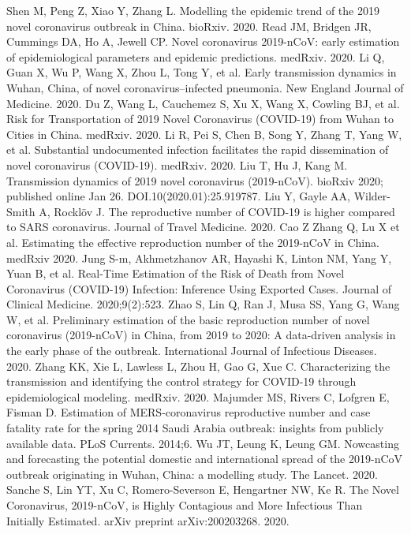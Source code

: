 \documentclass{article}
\begin{document}
\begin{thebibliography}{}
Shen M, Peng Z, Xiao Y, Zhang L. Modelling the epidemic trend of the 2019 novel coronavirus outbreak in China. bioRxiv. 2020.
Read JM, Bridgen JR, Cummings DA, Ho A, Jewell CP. Novel coronavirus 2019-nCoV: early estimation of epidemiological parameters and epidemic predictions. medRxiv. 2020.
Li Q, Guan X, Wu P, Wang X, Zhou L, Tong Y, et al. Early transmission dynamics in Wuhan, China, of novel coronavirus–infected pneumonia. New England Journal of Medicine. 2020.
Du Z, Wang L, Cauchemez S, Xu X, Wang X, Cowling BJ, et al. Risk for Transportation of 2019 Novel Coronavirus (COVID-19) from Wuhan to Cities in China. medRxiv. 2020.
Li R, Pei S, Chen B, Song Y, Zhang T, Yang W, et al. Substantial undocumented infection facilitates the rapid dissemination of novel coronavirus (COVID-19). medRxiv. 2020.
Liu T, Hu J, Kang M. Transmission dynamics of 2019 novel coronavirus (2019-nCoV). bioRxiv 2020; published online Jan 26. DOI.10(2020.01):25.919787.
Liu Y, Gayle AA, Wilder-Smith A, Rocklöv J. The reproductive number of COVID-19 is higher compared to SARS coronavirus. Journal of Travel Medicine. 2020.
Cao Z Zhang Q, Lu X et al. Estimating the effective reproduction number of the 2019-nCoV in China. medRxiv 2020.
Jung S-m, Akhmetzhanov AR, Hayashi K, Linton NM, Yang Y, Yuan B, et al. Real-Time Estimation of the Risk of Death from Novel Coronavirus (COVID-19) Infection: Inference Using Exported Cases. Journal of Clinical Medicine. 2020;9(2):523.
Zhao S, Lin Q, Ran J, Musa SS, Yang G, Wang W, et al. Preliminary estimation of the basic reproduction number of novel coronavirus (2019-nCoV) in China, from 2019 to 2020: A data-driven analysis in the early phase of the outbreak. International Journal of Infectious Diseases. 2020.
Zhang KK, Xie L, Lawless L, Zhou H, Gao G, Xue C. Characterizing the transmission and identifying the control strategy for COVID-19 through epidemiological modeling. medRxiv. 2020.
Majumder MS, Rivers C, Lofgren E, Fisman D. Estimation of MERS-coronavirus reproductive number and case fatality rate for the spring 2014 Saudi Arabia outbreak: insights from publicly available data. PLoS Currents. 2014;6.
Wu JT, Leung K, Leung GM. Nowcasting and forecasting the potential domestic and international spread of the 2019-nCoV outbreak originating in Wuhan, China: a modelling study. The Lancet. 2020.
Sanche S, Lin YT, Xu C, Romero-Severson E, Hengartner NW, Ke R. The Novel Coronavirus, 2019-nCoV, is Highly Contagious and More Infectious Than Initially Estimated. arXiv preprint arXiv:200203268. 2020.

\end{thebibliography}
\end{document}
